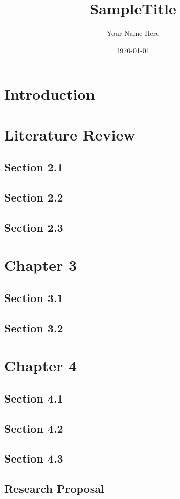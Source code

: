\documentclass[12pt]{report}
\begin{document}
    \title{SampleTitle}

    \author{Your Name Here}

    \date{\vfill \monthyeardate\today}
        \maketitle


    \newpage
    \tableofcontents
    \newpage
    \listoffigures
    \chapter{\centering Introduction}\label{c1}

    \chapter{\centering Literature Review}\label{c2}
    \section{Section 2.1}\label{c21}
    \section{Section 2.2}\label{c22}
    \section{Section 2.3}\label{c23}
    \chapter{\centering Chapter 3}\label{c3}
    \section{Section 3.1}\label{c31}
    \section{Section 3.2}\label{c32}
    \chapter{\centering Chapter 4}\label{c4}
    \section{Section 4.1}\label{c41}
    \section{Section 4.2}\label{c42}
    \section{Section 4.3}\label{c43}
    \begin{appendices}
        \chapter{Research Proposal}\label{rp}

    \end{appendices}
        
\end{document}
